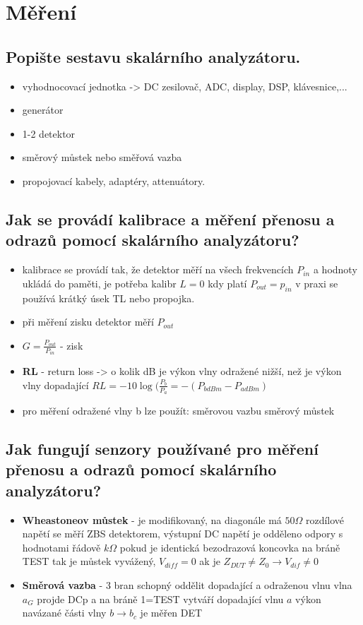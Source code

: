 \documentclass[a4paper,czech]{article}
\begin{document}
\section{Měření}
\subsection{\textbf{Popište sestavu skalárního analyzátoru.}}
\begin{itemize}
	\item vyhodnocovací jednotka -> DC zesilovač, ADC, display, DSP, klávesnice,...
	\item generátor
	\item 1-2 detektor
	\item směrový můstek nebo směřová vazba
	\item propojovací kabely, adaptéry, attenuátory.
\end{itemize}
\subsection{\textbf{Jak se provádí kalibrace a měření přenosu a odrazů pomocí skalárního analyzátoru? }}
\begin{itemize}
	\item kalibrace se provádí tak, že detektor měří na všech frekvencích $P_{in}$ a hodnoty ukládá do paměti, je potřeba kalibr $L=0$ kdy platí $P_{out}=p_{in}$ v praxi se používá krátký úsek TL nebo propojka.
	\item při měření zisku detektor měří $P_{out}$
	\item $G=\frac{P_{out}}{P_{in}}$ - zisk
	\item \textbf{RL} - return loss -> o kolik dB je výkon vlny odražené nižší, než je výkon vlny dopadající $RL = -10\log(\frac{P_b}{P_a}=-(P_{bdBm}-P_{adBm})$
	\item pro měření odražené vlny b lze použít:
	\subitem směrovou vazbu
	\subitem směrový můstek
\end{itemize}
\subsection{\textbf{Jak fungují senzory používané pro měření přenosu a odrazů pomocí skalárního analyzátoru? }}
\begin{itemize}
	\item \textbf{Wheastoneov můstek} - je modifikovaný, na diagonále má $50 \Omega$
	\subitem rozdílové napětí se měří ZBS detektorem, výstupní DC napětí je odděleno odpory s hodnotami řádově $k\Omega$
	\subitem pokud je identická bezodrazová koncovka na bráně TEST tak je můstek vyvážený, $V_{diff}=0$
	\subitem ak je $Z_{DUT}\neq Z_0 \to V_{dif}\neq 0$
	\item \textbf{Směrová vazba} - 3 bran schopný oddělit dopadající a odraženou vlnu
	\subitem vlna $a_G$ projde DCp a na bráně 1=TEST vytváří dopadající vlnu $a$
	\subitem výkon navázané části vlny $b \to b_c$ je měřen DET
\end{itemize}
\end{document}
